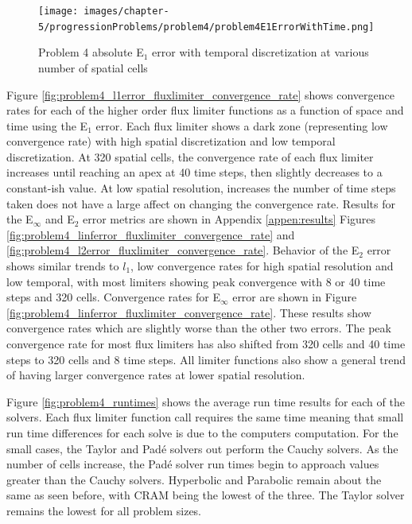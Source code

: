 \clearpage

\begin{figure}[p]
    \centering
    \texttt{[image: images/chapter-5/progressionProblems/problem4/problem4E1ErrorWithTime.png]}
    \caption{Problem 4 absolute E${}_{1}$ error with temporal discretization at various number of spatial cells}
    \label{fig:problem4_l1error_time_results}
\end{figure}

\clearpage

Figure \ref{fig:problem4_l1error_fluxlimiter_convergence_rate} shows convergence rates for each of the higher order flux limiter functions as a function of space and time using the E${}_{1}$ error. Each flux limiter shows a dark zone (representing low convergence rate) with high spatial discretization and low temporal discretization. At 320 spatial cells, the convergence rate of each flux limiter increases until reaching an apex at 40 time steps, then slightly decreases to a constant-ish value. At low spatial resolution, increases the number of time steps taken does not have a large affect on changing the convergence rate. Results for the E${}_{\infty}$ and E${}_{2}$ error metrics are shown in Appendix \ref{appen:results} Figures \ref{fig:problem4_linferror_fluxlimiter_convergence_rate} and \ref{fig:problem4_l2error_fluxlimiter_convergence_rate}. Behavior of the E${}_{2}$ error shows similar trends to $l_{1}$, low convergence rates for high spatial resolution and low temporal, with most limiters showing peak convergence with 8 or 40 time steps and 320 cells. Convergence rates for E${}_{\infty}$ error are shown in Figure \ref{fig:problem4_linferror_fluxlimiter_convergence_rate}. These results show convergence rates which are slightly worse than the other two errors. The peak convergence rate for most flux limiters has also shifted from 320 cells and 40 time steps to 320 cells and 8 time steps. All limiter functions also show a general trend of having larger convergence rates at lower spatial resolution. 

Figure \ref{fig:problem4_runtimes} shows the average run time results for each of the solvers. Each flux limiter function call requires the same time meaning that small run time differences for each solve is due to the computers computation. For the small cases, the Taylor and Pad\'e solvers out perform the Cauchy solvers. As the number of cells increase, the Pad\'e solver run times begin to approach values greater than the Cauchy solvers. Hyperbolic and Parabolic remain about the same as seen before, with CRAM being the lowest of the three. The Taylor solver remains the lowest for all problem sizes. 

